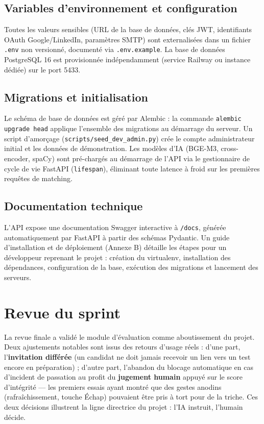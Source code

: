 \documentclass[12pt,a4paper]{report}
\begin{document}
\subsection{Variables d'environnement et configuration}

Toutes les valeurs sensibles (URL de la base de données, clés JWT, identifiants OAuth Google/LinkedIn, paramètres SMTP) sont externalisées dans un fichier \texttt{.env} non versionné, documenté via \texttt{.env.example}. La base de données PostgreSQL 16 est provisionnée indépendamment (service Railway ou instance dédiée) sur le port 5433.

\subsection{Migrations et initialisation}

Le schéma de base de données est géré par Alembic : la commande \texttt{alembic upgrade head} applique l'ensemble des migrations au démarrage du serveur. Un script d'amorçage (\texttt{scripts/seed\_dev\_admin.py}) crée le compte administrateur initial et les données de démonstration. Les modèles d'IA (BGE-M3, cross-encoder, spaCy) sont pré-chargés au démarrage de l'API via le gestionnaire de cycle de vie FastAPI (\texttt{lifespan}), éliminant toute latence à froid sur les premières requêtes de matching.

\subsection{Documentation technique}

L'API expose une documentation Swagger interactive à \texttt{/docs}, générée automatiquement par FastAPI à partir des schémas Pydantic. Un guide d'installation et de déploiement (Annexe B) détaille les étapes pour un développeur reprenant le projet : création du virtualenv, installation des dépendances, configuration de la base, exécution des migrations et lancement des serveurs.

\section{Revue du sprint}

La revue finale a validé le module d'évaluation comme aboutissement du projet. Deux ajustements notables sont issus des retours d'usage réels : d'une part, l'\textbf{invitation différée} (un candidat ne doit jamais recevoir un lien vers un test encore en préparation) ; d'autre part, l'abandon du blocage automatique en cas d'incident de passation au profit du \textbf{jugement humain} appuyé sur le score d'intégrité --- les premiers essais ayant montré que des gestes anodins (rafraîchissement, touche Échap) pouvaient être pris à tort pour de la triche. Ces deux décisions illustrent la ligne directrice du projet : l'IA instruit, l'humain décide.
\end{document}
